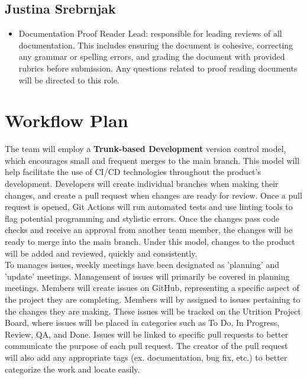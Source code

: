 \documentclass{article}
\begin{document}
\subsection{Justina Srebrnjak}

\begin{itemize}
	\item Documentation Proof Reader Lead: responsible for leading reviews of all documentation. This includes ensuring the document is cohesive, correcting any grammar or spelling errors, and grading the document with provided rubrics before submission. Any questions related to proof reading documents will be directed to this role.   
\end{itemize}

\section{Workflow Plan}

The team will employ a \textbf{Trunk-based Development} version control model, 
which encourages small and frequent merges to the main branch. This model will 
help facilitate the use of CI/CD technologies throughout the product's 
development. Developers will create individual branches when making their 
changes, and create a pull request when changes are ready for review. Once a 
pull request is opened, Git Actions will run automated tests and use linting 
tools to flag potential programming and stylistic errors. Once the changes pass 
code checks and receive an approval from another team member, the changes will 
be ready to merge into the main branch. Under this model, changes to the 
product will be added and reviewed, quickly and consistently.
\\

To manages issues, weekly meetings have been designated as 'planning' and 
'update' meetings. Management of issues will primarily be covered in planning 
meetings. Members will create issues on GitHub, representing a specific aspect 
of the project they are completing. Members will by assigned to issues 
pertaining to the changes they are making. These issues will be tracked on the Utrition Project Board, where issues will be placed in categories such as To Do, In Progress, Review, QA, and Done. Issues will be linked to specific 
pull requests to better communicate the purpose of each pull request. The creator of the pull request will also add any appropriate tags (ex. documentation, bug fix, etc.) to better categorize the work and locate easily.
\\
\end{document}
